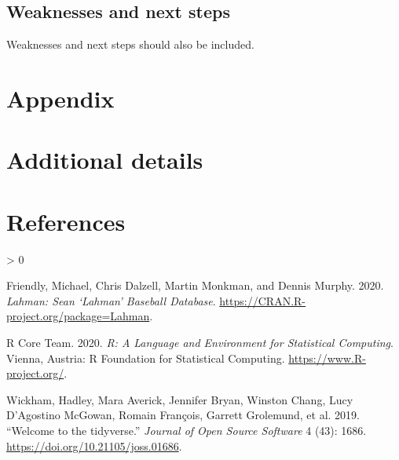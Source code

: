 \documentclass[
]{article}
\newlength{\cslhangindent}
\newenvironment{CSLReferences}[2] %
 {%
  \setlength{\parindent}{0pt}
  \ifodd #1 \everypar{\setlength{\hangindent}{\cslhangindent}}\ignorespaces\fi
  \ifnum #2 > 0
  \setlength{\parskip}{#2\baselineskip}
  \fi
 }%
 {}
\begin{document}
\hypertarget{weaknesses-and-next-steps}{%
\subsection{Weaknesses and next steps}\label{weaknesses-and-next-steps}}

Weaknesses and next steps should also be included.

\newpage

\appendix

\hypertarget{appendix}{%
\section*{Appendix}\label{appendix}}

\hypertarget{additional-details}{%
\section{Additional details}\label{additional-details}}

\newpage

\hypertarget{references}{%
\section*{References}\label{references}}

\hypertarget{refs}{}
\begin{CSLReferences}{1}{0}
\leavevmode\hypertarget{ref-citeLahman}{}%
Friendly, Michael, Chris Dalzell, Martin Monkman, and Dennis Murphy. 2020. \emph{Lahman: Sean {`Lahman'} Baseball Database}. \url{https://CRAN.R-project.org/package=Lahman}.

\leavevmode\hypertarget{ref-citeR}{}%
R Core Team. 2020. \emph{R: A Language and Environment for Statistical Computing}. Vienna, Austria: R Foundation for Statistical Computing. \url{https://www.R-project.org/}.

\leavevmode\hypertarget{ref-thereferencecanbewhatever}{}%
Wickham, Hadley, Mara Averick, Jennifer Bryan, Winston Chang, Lucy D'Agostino McGowan, Romain François, Garrett Grolemund, et al. 2019. {``Welcome to the {tidyverse}.''} \emph{Journal of Open Source Software} 4 (43): 1686. \url{https://doi.org/10.21105/joss.01686}.

\end{CSLReferences}
\end{document}
